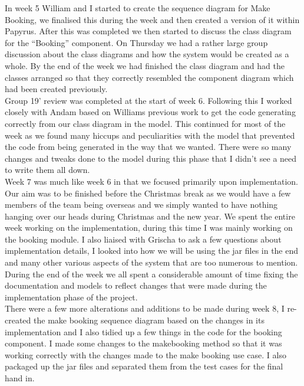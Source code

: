 \documentclass{article}
\begin{document}
In week 5 William and I started to create the sequence diagram for Make Booking, we finalised this during the week and then created a version of it within Papyrus. After this was completed we then started to discuss the class diagram for the “Booking” component. On Thursday we had a rather large group discussion about the class diagrams and how the system would be created as a whole. By the end of the week we had finished the class diagram and had the classes arranged so that they correctly resembled the component diagram which had been created previously.
\\

Group 19' review was completed at the start of week 6. Following this I worked closely with Andam based on Williams previous work to get the code generating correctly from our class diagram in the model. This continued for most of the week as we found many hiccups and peculiarities with the model that prevented the code from being generated in the way that we wanted. There were so many changes and tweaks done to the model during this phase that I didn't see a need to write them all down. 
\\

Week 7 was much like week 6 in that we focused primarily upon implementation. Our aim was to be finished before the Christmas break as we would have a few members of the team being overseas and we simply wanted to have nothing hanging over our heads during Christmas and the new year. We spent the entire week working on the implementation, during this time I was mainly working on the booking module. I also liaised with Grischa to ask a few questions about implementation details, I looked into how we will be using the jar files in the end and many other various aspects of the system that are too numerous to mention. During the end of the week we all spent a considerable amount of time fixing the documentation and models to reflect changes that were made during the implementation phase of the project. 
\\

There were a few more alterations and additions to be made during week 8, I re-created the make booking sequence diagram based on the changes in its implementation and I also tidied up a few things in the code for the booking component. I made some changes to the makebooking method so that it was working correctly with the changes made to the make booking use case. I also packaged up the jar files and separated them from the test cases for the final hand in.
\end{document}
